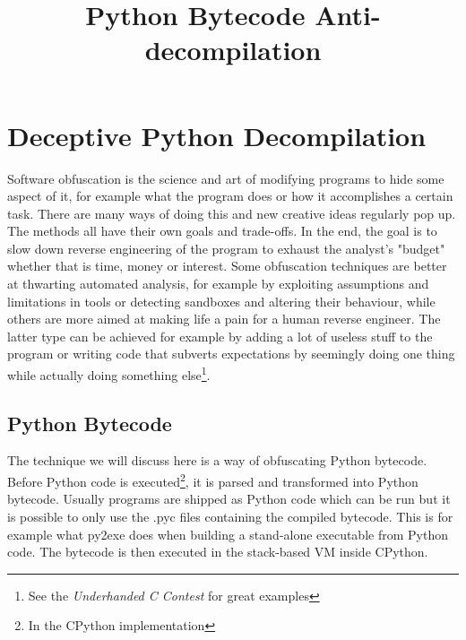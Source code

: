 \documentclass[twocolumn]{article}
\begin{document}
\title{Python Bytecode Anti-decompilation}
\date{}
\section*{Deceptive Python Decompilation}

\vspace*{-0.5\baselineskip}

Software obfuscation is the science and art of modifying programs to hide some aspect of it, for example what the program does or how it accomplishes a certain task. There are many ways of doing this and new creative ideas regularly pop up. The methods all have their own goals and trade-offs. In the end, the goal is to slow down reverse engineering of the program to exhaust the analyst's "budget" whether that is time, money or interest. Some obfuscation techniques are better at thwarting automated analysis, for example by exploiting assumptions and limitations in tools or detecting sandboxes and altering their behaviour, while others are more aimed at making life a pain for a human reverse engineer. The latter type can be achieved for example by adding a lot of useless stuff to the program or writing code that subverts expectations by seemingly doing one thing while actually doing something else\footnote{See the \textit{Underhanded C Contest} for great examples}.

\vspace*{-1\baselineskip}

\subsection*{Python Bytecode}

\vspace*{-0.3\baselineskip}

The technique we will discuss here is a way of obfuscating Python bytecode. Before Python code is executed\footnote{In the CPython implementation}, it is parsed and transformed into Python bytecode. Usually programs are shipped as Python code which can be run but it is possible to only use the .pyc files containing the compiled bytecode. This is for example what py2exe does when building a stand-alone executable from Python code. The bytecode is then executed in the stack-based VM inside CPython.

\vspace*{-1\baselineskip}
\end{document}
